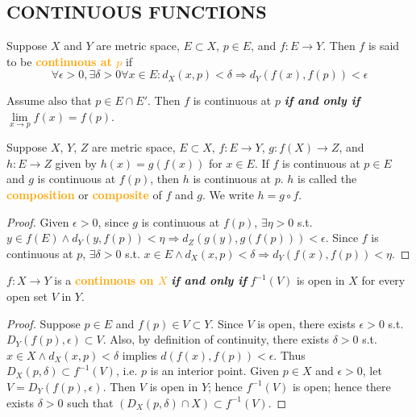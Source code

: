 \subsection{CONTINUOUS FUNCTIONS}

\begin{definition}
Suppose $X$ and $Y$ are metric space, $E\subset X$, $p\in E$, and $f:E\to Y$. Then $f$ is said to be \textbf{\textcolor{orange}{continuous at $p$}} if
$$ \forall \epsilon>0,\exists \delta>0 \forall x\in E:d_X(x,p)<\delta \Rightarrow d_Y(f(x),f(p))<\epsilon$$
\end{definition}

\begin{theorem}
Assume also that $p\in E\cap E'$. Then $f$ is continuous at $p$ \textbf{\emph{if and only if}} $\lim\limits_{x\to p}f(x)=f(p)$.
\end{theorem}

\begin{theorem}
Suppose $X$, $Y$, $Z$ are metric space, $E\subset X$, $f:E\to Y$, $g:f(X)\to Z$, and $h: E\to Z$ given by $h(x)=g(f(x))$ for $x\in E$. If $f$ is continuous at $p\in E$ and $g$ is continuous at $f(p)$, then $h$ is continuous at $p$. $h$ is called the \textbf{\textcolor{orange}{composition}} or \textbf{\textcolor{orange}{composite}} of $f$ and $g$. We write $h = g\circ f$.
\end{theorem}
\begin{proof}
Given $\epsilon>0$, since $g$ is continuous at $f(p)$, $\exists \eta>0$ s.t. $y\in f(E)\land d_Y(y,f(p))<\eta \Rightarrow d_Z(g(y),g(f(p)))<\epsilon$. Since $f$ is continuous at $p$, $\exists \delta>0$ s.t. $x\in E\land d_X(x,p)<\delta \Rightarrow d_Y(f(x),f(p))<\eta$.
\end{proof}

\begin{theorem} \label{thm:equivalent_definition_of_continuity}
$f:X\to Y$ is a \textbf{\textcolor{orange}{continuous on $X$}} \textbf{\emph{if and only if}} $f^{-1}(V)$ is open in $X$ for every open set $V$ in $Y$.
\end{theorem}
\begin{proof}
\forward Suppose $p\in E$ and $f(p)\in V\subset Y$. Since $V$ is open, there exists $\epsilon >0$ s.t. $D_Y(f(p),\epsilon)\subset V$. Also, by definition of continuity, there exists $\delta>0$ s.t. $x\in X\land d_X(x,p)<\delta$ implies $d(f(x),f(p))< \epsilon$. Thus $D_X(p,\delta)\subset f^{-1}(V)$, i.e. $p$ is an interior point.
\backward Given $p\in X$ and $\epsilon>0$, let $V=D_Y(f(p),\epsilon)$. Then $V$ is open in $Y$; hence $f^{-1}(V)$ is open; hence there exists $\delta>0$ such that $(D_X(p,\delta)\cap X)\subset f^{-1}(V)$.
\end{proof}

